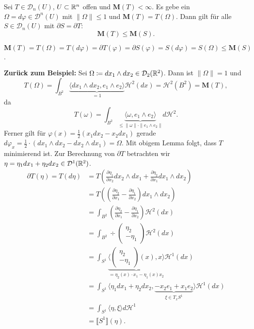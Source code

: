 \documentclass[a4paper,twoside,DIV15,BCOR12mm]{scrbook}
\newcommand{\HM}{\mathscr H}
\newcommand{\MN}{\mathbf M}
\begin{document}
\begin{lemma}
Sei $T \in \mathcal D_n(U)$, $U \subset \mathbb{R}^n$ offen und $\MN(T) < \infty$. Es gebe ein $\Omega = d\varphi \in \mathcal D^n(U)$ mit $\|\Omega\|\leq1$ und $\MN(T) = T(\Omega)$. Dann gilt für alle $S\in\mathcal{D}_n(U)$ mit $\partial S = \partial T$:
$$
	\MN(T) \leq \MN(S).
$$
\end{lemma}

\begin{beweis}
$\MN(T) = T(\Omega) = T(d\varphi) = \partial T(\varphi) = \partial S(\varphi) = S(d\varphi) = S(\Omega) \leq \MN(S)$.
\end{beweis}

\textbf{Zurück zum Beispiel:} Sei $\Omega \da dx_1 \wedge dx_2 \in \mathcal D_2(\MdR^2)$. Dann ist $\|\Omega\|=1$ und
$$
	T(\Omega) = \int_{B^2} \underbrace{\langle dx_1 \wedge dx_2, e_1 \wedge e_2 \rangle}_{=1} \HM^2(dx) = \HM^2(B^2) = \MN(T),
$$
da
$$
	T(\omega) = \int_{B^2} \underbrace{\langle \omega, e_1\wedge e_2 \rangle}_{\leq \|\omega\|\cdot\|e_1\wedge e_2\|} d\HM^2.
$$
Ferner gilt für $\varphi(x) = \frac12 (x_1 dx_2 - x_2 dx_1)$ gerade $d\varphi_x = \frac12 \cdot (dx_1 \wedge dx_2 - dx_2 \wedge dx_1) = \Omega$. Mit obigem Lemma folgt, dass $T$ minimierend ist. Zur Berechnung von 
$\partial T$ betrachten wir $\eta = \eta_1 dx_1 + \eta_2 dx_2 \in \mathcal D^1(\mathbb{R}^2)$.
\begin{align*}
	\partial T(\eta) = T(d\eta) &= T(\frac{\partial \eta_1}{\partial x_2} dx_2 \wedge dx_1 + \frac{\partial \eta_2}{\partial x_1} dx_1 \wedge dx_2) \\
	&= T((\frac{\partial \eta_2}{\partial x_1} - \frac{\partial \eta_1}{\partial x_2}) dx_1 \wedge dx_2) \\
	&= \int_{B^2} (\frac{\partial \eta_2}{\partial x_1} - \frac{\partial \eta_1}{\partial x_2}) \HM^2(dx) \\
	&= \int_{B^2} \div \begin{pmatrix} \eta_2 \\ -\eta_1 \end{pmatrix} \HM^2(dx) \\
	&= \int_{S^1} \underbrace{\langle \begin{pmatrix}\eta_2\\-\eta_1\end{pmatrix}(x),x \rangle}_{= \eta_2(x)\cdot x_1 - \eta_1(x) x_2} \HM^1(dx) \\
	&= \int_{S^1} \langle \eta_1 dx_1 + \eta_2 dx_2, \underbrace{-x_2 e_1 + x_1 e_2}_{\xi \in T_x S^1} \rangle \HM^1(dx) \\
	&= \int_{S^1} \langle \eta, \xi \rangle d\HM^1 \\
	&= \llbracket S^1 \rrbracket (\eta).
\end{align*}
\end{document}

